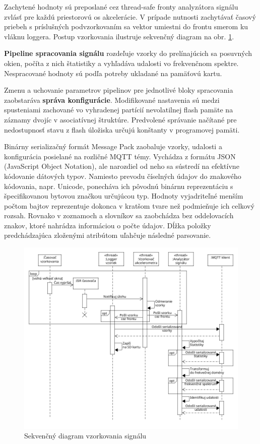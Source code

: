 Zachytené hodnoty sú preposlané cez thread-safe fronty analyzátora signálu zvlásť pre každú priestorovú os akcelerácie. 
V prípade nutnosti zachytávať časový priebeh s príslušných podvzorkovaním sa vektor umiestni do frontu smerom ku vláknu loggera. 
Postup vzorkovania ilustruje sekvenčný diagram na obr. \ref{uml:sequence}.

\textbf{Pipeline spracovania signálu} rozdeľuje vzorky do prelínajúcich sa posuvných okien, počíta z nich štatistiky a vyhľadáva udalosti vo 
frekvenčnom spektre. Nespracované hodnoty sú podľa potreby ukladané na pamäťovú kartu. 

Zmenu a uchovanie parametrov pipelinov pre jednotlivé bloky spracovania zaobstaráva \textbf{správa konfigurácie}. Modifikované nastavenia sú 
medzi spusteniami zachované vo vyhradenej partícií nevolatilnej flash pamäte na záznamy dvojíc v asociatívnej štruktúre. Predvolené 
správanie načítané pre nedostupnosť stavu z flash úložiska určujú konštanty v programovej pamäti.

Binárny serializačný formát Message Pack zaobaluje vzorky, udalosti a konfigurácia posielané na rozličné MQTT témy. Vychádza z 
formátu JSON (JavaScript Object Notation), ale narozdiel od neho sa sústredí na efektívne kódovanie dátových typov. Namiesto prevodu 
číselných údajov do znakového kódovania, napr. Unicode, ponecháva ich pôvodnú binárnu reprezentáciu s špecifikovanou bytovou značkou 
určujúcou typ. Hodnoty vyjadriteľné menším počtom bajtov reprezentuje dokonca v kratšom tvare než podmieňuje ich celkový rozsah.
Rovnako v zoznamoch a slovníkov sa  zaobchádza bez oddelovacích znakov, ktoré nahrádza informáciou o počte údajov. Dĺžka 
položky predchádzajúca zloženými atribútom uľahčuje následné parsovanie.

\begin{figure}[h]
	\centering
	\includegraphics[width=\textwidth]{figures/design/tasks.png}
	\caption{Sekvenčný diagram vzorkovania signálu}
	\label{uml:sequence}
\end{figure}

